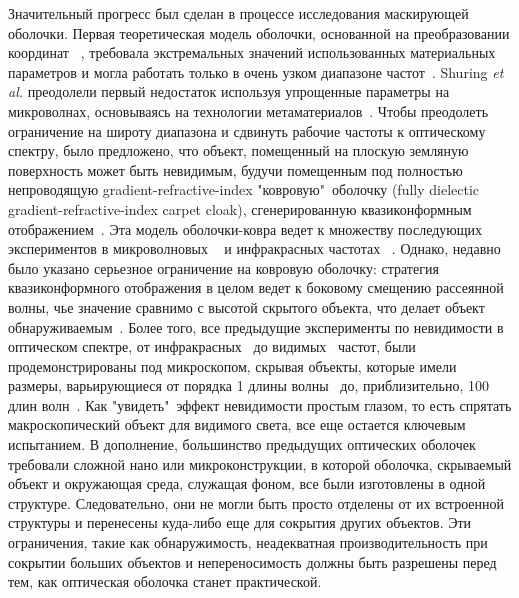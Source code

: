 \documentclass[a4paper, 12pt]{article}
\begin{document}
Значительный прогресс был сделан в процессе исследования маскирующей оболочки.
Первая теоретическая модель оболочки, основанной на преобразовании координат 
~\cite{pendry}, требовала экстремальных значений использованных материальных 
параметров и могла работать только в очень узком диапазоне частот~\cite{pendry,
baile_rainbow}. Shuring  \textit{et al.} преодолели первый недостаток 
используя упрощенные параметры на
микроволнах, основываясь на технологии метаматериалов~\cite{schurig}. 
Чтобы преодолеть
ограничение на широту диапазона и сдвинуть рабочие частоты к оптическому
спектру, было предложено, что объект, помещенный на плоскую земляную
поверхность может быть невидимым, будучи помещенным под полностью непроводящую
gradient-refractive-index "ковровую"\ оболочку
(fully dielectic gradient-refractive-index carpet cloak), 
сгенерированную квазиконформным отображением~\cite{li_carpet}.
Эта модель оболочки-ковра
ведет к множеству последующих экспериментов в микроволновых
~\cite{ruopeng,huifeng} и инфракрасных частотах
~\cite{valentine,gabrielli,park,ergin}. 
Однако, недавно было указано серьезное
ограничение на ковровую оболочку: стратегия квазиконформного отображения
в целом ведет к боковому смещению рассеянной волны, чье значение сравнимо с 
высотой скрытого объекта, что делает объект 
обнаруживаемым~\cite{baile_lateral_shift}. Более того,
все предыдущие эксперименты по невидимости в оптическом спектре, от
инфракрасных~\cite{valentine,gabrielli,park,ergin} до 
видимых~\cite{smolyaninov_SPP,smolyaninov_waveguide} частот, были 
продемонстрированы под микроскопом, скрывая объекты, которые имели размеры, 
варьирующиеся от порядка 1 длины 
волны~\cite{smolyaninov_SPP,valentine,gabrielli,park,ergin} до, 
приблизительно, 100 длин волн~\cite{smolyaninov_waveguide}.
Как  "увидеть"\ эффект невидимости простым глазом, то есть спрятать
макроскопический объект для видимого света, все еще остается 
ключевым испытанием. В дополнение, большинство предыдущих оптических оболочек
~\cite{smolyaninov_SPP,valentine,gabrielli,park,ergin} требовали сложной нано 
или микроконструкции, в которой оболочка,
скрываемый объект и окружающая среда, служащая фоном, все были изготовлены
в одной структуре. Следовательно, они не могли быть просто отделены от их
встроенной структуры и перенесены куда-либо еще для сокрытия других объектов.
Эти ограничения, такие как обнаружимость, неадекватная производительность при
сокрытии больших объектов и непереносимость должны быть разрешены перед тем,
как оптическая оболочка станет практической.
\end{document}
